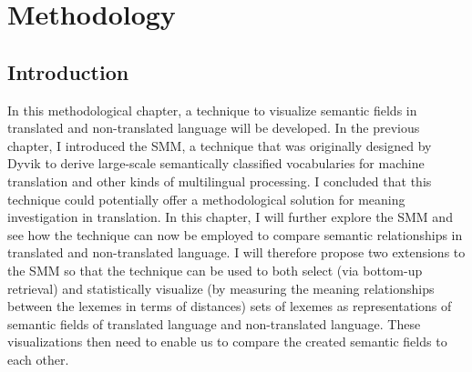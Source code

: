 \chapter{Methodology}
\label{sec:3}

\section{Introduction}
\label{sec:3.1}  
In this methodological chapter, a technique to visualize semantic fields in translated and non-translated language will be developed. In the previous chapter, I introduced the SMM, a technique that was originally designed by Dyvik \citep{johansson_translational_1998,langemets_translations_2005} to derive large-scale semantically classified vocabularies for machine translation and other kinds of multilingual processing. I concluded that this technique could potentially offer a methodological solution for meaning investigation in translation. In this chapter, I will further explore the SMM and see how the technique can now be employed to compare semantic relationships in translated and non-translated language. I will therefore propose two extensions to the SMM so that the technique can be used to both select (via bottom-up retrieval) and statistically visualize (by measuring the meaning relationships between the lexemes in terms of distances) sets of lexemes as representations of semantic fields of translated language and non-translated language. These visualizations then need to enable us to compare the created semantic fields to each other.

